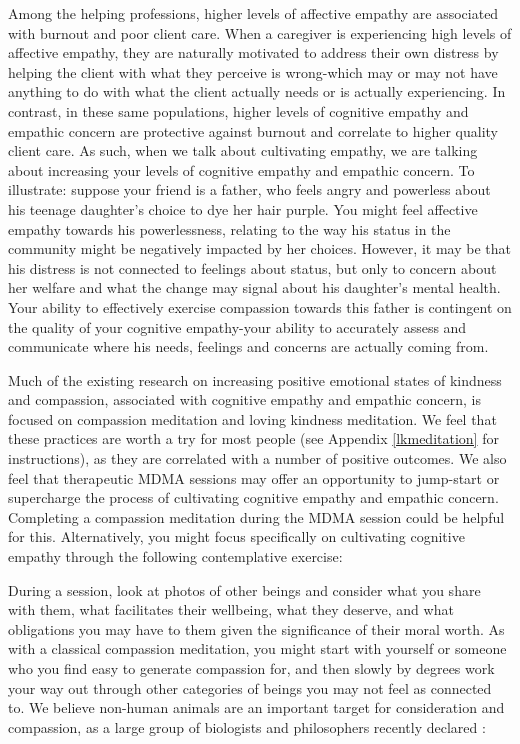 \documentclass[12pt,letterpaper]{book}
\begin{document}
Among the helping professions, higher levels of affective empathy are associated with burnout and poor client care. When a caregiver is experiencing high levels of affective empathy, they are naturally motivated to address their own distress by helping the client with what they perceive is wrong-which may or may not have anything to do with what the client actually needs or is actually experiencing. In contrast, in these same populations, higher levels of cognitive empathy and empathic concern are protective against burnout and correlate to higher quality client care. As such, when we talk about cultivating empathy, we are talking about increasing your levels of cognitive empathy and empathic concern. To illustrate: suppose your friend is a father, who feels angry and powerless about his teenage daughter's choice to dye her hair purple. You might feel affective empathy towards his powerlessness, relating to the way his status in the community might be negatively impacted by her choices. However, it may be that his distress is not connected to feelings about status, but only to concern about her welfare and what the change may signal about his daughter's mental health. Your ability to effectively exercise compassion towards this father is contingent on the quality of your cognitive empathy-your ability to accurately assess and communicate where his needs, feelings and concerns are actually coming from.

Much of the existing research on increasing positive emotional states of kindness and compassion, associated with cognitive empathy and empathic concern, is focused on compassion meditation and loving kindness meditation. We feel that these practices are worth a try for most people (see Appendix \ref{lkmeditation} for instructions), as they are correlated with a number of positive outcomes. We also feel that therapeutic MDMA sessions may offer an opportunity to jump-start or supercharge the process of cultivating cognitive empathy and empathic concern. Completing a compassion meditation during the MDMA session could be helpful for this. Alternatively, you might focus specifically on cultivating cognitive empathy through the following contemplative exercise:

During a session, look at photos of other beings and consider what you share with them, what facilitates their wellbeing, what they deserve, and what obligations you may have to them given the significance of their moral worth. As with a classical compassion meditation, you might start with yourself or someone who you find easy to generate compassion for, and then slowly by degrees work your way out through other categories of beings you may not feel as connected to. We believe non-human animals are an important target for consideration and compassion, as a large group of biologists and philosophers recently declared \cite{newYorkAnimal}:
\end{document}
